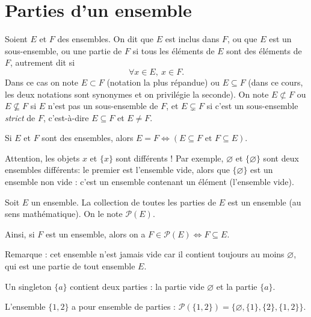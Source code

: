 \section{Parties d'un ensemble}

\begin{definition}
Soient $E$ et $F$ des ensembles. On dit que $E$ est inclus dans $F$, ou que $E$ est un sous-ensemble, ou une partie de $F$ si tous les éléments de $E$ sont des éléments de $F$, autrement dit si 
\[
\forall x\in E, \: x\in F.
\]
Dans ce cas on note $E\subset F$ (notation la plus répandue) ou $E\subseteq F$ (dans ce cours, les deux notations sont synonymes et on privilégie la seconde). On note $E\not\subset F$ ou $E\nsubseteq F$ si $E$ n'est pas un sous-ensemble de $F$, et $E\subsetneq F$  si c'est un sous-ensemble \emph{strict} de $F$, c'est-à-dire $E\subseteq F$ et $E\neq F$.
\end{definition}

\begin{remarque} Si $E$ et $F$ sont des ensembles, alors 
$
E=F \iff \left(E\subseteq F \text{ et } F \subseteq E\right).
$
\end{remarque}


\begin{remarque}
Attention, les objets $x$ et $\{x\}$ sont différents !  Par exemple, $\varnothing$ et $\{\varnothing\}$ sont deux ensembles différents:  le premier est l'ensemble vide, alors que $\{\varnothing\}$ est un ensemble non vide : c'est un ensemble contenant un élément (l'ensemble vide).
\end{remarque}

\begin{axiomedef}
Soit $E$ un ensemble. La collection de toutes les parties de $E$ est un ensemble (au sens mathématique). On le note $\mathcal P(E)$. 

Ainsi, si $F$ est un ensemble, alors on a $F\in \mathcal P(E) \iff F\subseteq E$.
\end{axiomedef}

Remarque : cet ensemble n'est jamais vide car il contient toujours au moins $\varnothing$, qui est une partie de  tout ensemble $E$.

\begin{exemple}
Un singleton $\{a\}$ contient deux parties : la partie vide $\varnothing$ et la partie $\{a\}$. 

L'ensemble $\{1,2\}$ a pour ensemble de parties :  $\mathcal P(\{1,2\}) = \{\varnothing,\{1\},\{2\},\{1,2\}\}$.
\end{exemple}


